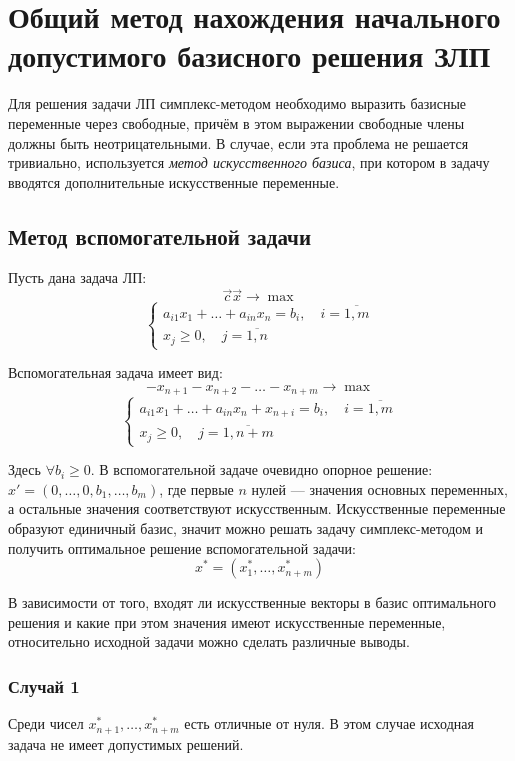 \documentclass[17pt]{extarticle}
\begin{document}
\section{Общий метод нахождения начального допустимого базисного решения ЗЛП}

Для решения задачи ЛП симплекс-методом необходимо выразить базисные переменные через свободные, причём в этом выражении свободные члены должны быть неотрицательными. В случае, если эта проблема не решается тривиально, используется \textit{метод искусственного базиса}, при котором в задачу вводятся дополнительные искусственные переменные.

\subsection{Метод вспомогательной задачи}

Пусть дана задача ЛП:
\[
    \vec{c}\vec{x} \to \max
\]
\[
    \begin{cases}
        a_{i1}x_1 + \dots + a_{in}x_n = b_i, \quad i = \overline{1,m} \\
        x_j \ge 0, \quad j = \overline{1,n}
    \end{cases}
\]

Вспомогательная задача имеет вид:
\[
    -x_{n+1} - x_{n+2} - \dots - x_{n+m} \to \max
\]
\[
    \begin{cases}
        a_{i1}x_1 + \dots + a_{in}x_n + x_{n+i} = b_i, \quad i = \overline{1,m} \\
        x_j \ge 0, \quad j = \overline{1,n+m}
    \end{cases}
\]

Здесь \( \forall b_i \ge 0 \). В вспомогательной задаче очевидно опорное решение: \( x' = (0, \dots, 0, b_1, \dots, b_m) \), где первые \( n \) нулей — значения основных переменных, а остальные значения соответствуют искусственным. Искусственные переменные образуют единичный базис, значит можно решать задачу симплекс-методом и получить оптимальное решение вспомогательной задачи:
\[
    x^* = (x_1^*, \dots, x_{n+m}^*)
\]

В зависимости от того, входят ли искусственные векторы в базис оптимального решения и какие при этом значения имеют искусственные переменные, относительно исходной задачи можно сделать различные выводы.

\subsubsection{Случай 1}
Среди чисел \( x_{n+1}^*, \dots, x_{n+m}^* \) есть отличные от нуля. В этом случае исходная задача не имеет допустимых решений.
\end{document}
